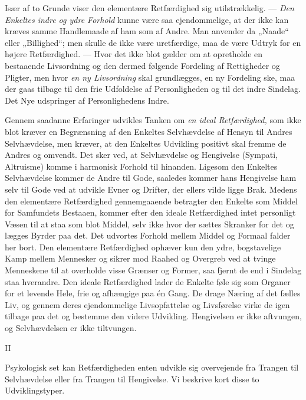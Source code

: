 \documentclass[12pt,a4paper,openany]{book}
\newcommand{\opage}[1]{\marginnote{\footnotesize\textit{[#1]}}}
\begin{document}
Især af to Grunde viser den elementære Retfærdighed sig
utilstrækkelig. --- \textit{Den Enkeltes indre og ydre Forhold} kunne være
saa ejendommelige, at der ikke kan kræves samme Handlemaade
af ham som af Andre. Man anvender da „Naade“ eller „Billighed“;
men skulle de ikke være uretfærdige, maa de være Udtryk
for en højere Retfærdighed. --- Hvor det ikke blot gælder
om at opretholde en bestaaende Livsordning og den dermed
følgende Fordeling af Rettigheder og Pligter, men hvor \textit{en ny
Livsordning} skal grundlægges, en ny Fordeling ske, maa der
\setcounter{footnote}{0}%
\opage{56}gaas tilbage til den frie Udfoldelse af Personligheden og til det
indre Sindelag. Det Nye udspringer af Personlighedens Indre.

Gennem saadanne Erfaringer udvikles Tanken om \textit{en ideal
Retfærdighed,} som ikke blot kræver en Begrænsning af den
Enkeltes Selvhævdelse af Hensyn til Andres Selvhævdelse, men
kræver, at den Enkeltes Udvikling positivt skal fremme de Andres
og omvendt. Det sker ved, at Selvhævdelse og Hengivelse
(Sympati, Altruisme) komme i harmonisk Forhold til hinanden.
Ligesom den Enkeltes Selvhævdelse kommer de Andre til Gode,
saaledes kommer hans Hengivelse ham selv til Gode ved at
udvikle Evner og Drifter, der ellers vilde ligge Brak. Medens
den elementære Retfærdighed gennemgaaende betragter den
Enkelte som Middel for Samfundets Bestaaen, kommer efter den
ideale Retfærdighed intet personligt Væsen til at staa som blot
Middel, selv ikke hvor der sættes Skranker for det og lægges
Byrder paa det. Det udvortes Forhold mellem Middel og Formaal
falder her bort. Den elementære Retfærdighed ophæver
kun den ydre, bogstavelige Kamp mellem Mennesker og sikrer
mod Raahed og Overgreb ved at tvinge Menneskene til at overholde
visse Grænser og Former, saa fjernt de end i Sindelag
staa hverandre. Den ideale Retfærdighed lader de Enkelte føle
sig som Organer for et levende Hele, frie og afhængige paa
én Gang. De drage Næring af det fælles Liv, og gennem deres
ejendommelige Livsopfattelse og Livsførelse virke de igen tilbage
paa det og bestemme den videre Udvikling. Hengivelsen er ikke
aftvungen, og Selvhævdelsen er ikke tiltvungen.

\begin{center}II\end{center}


Psykologisk set kan Retfærdigheden enten udvikle sig overvejende
fra Trangen til Selvhævdelse eller fra Trangen til Hengivelse.
Vi beskrive kort disse to Udviklingstyper.
\end{document}
